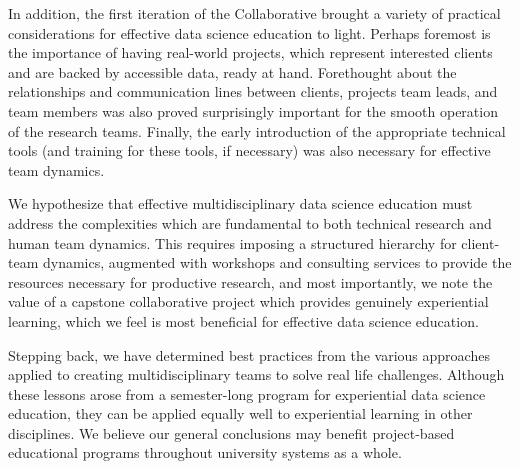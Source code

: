 \documentclass{sig-alternate}
\begin{document}
In addition, the first iteration of the Collaborative brought a variety of practical considerations for effective data science education to light.  Perhaps foremost is the importance of having real-world projects, which represent interested clients and are backed by accessible data, ready at hand.  Forethought about the relationships and communication lines between clients, projects team leads, and team members was also proved surprisingly important for the smooth operation of the research teams.  Finally, the early introduction of the appropriate technical tools (and training for these tools, if necessary) was also necessary for effective team dynamics.

We hypothesize that effective multidisciplinary data science education must address the complexities which are fundamental to both technical research and human team dynamics. This requires imposing a structured hierarchy for client-team dynamics, augmented with workshops and consulting services to provide the resources necessary for productive research, and most importantly, we note the value of a capstone collaborative project which provides genuinely experiential learning, which we feel is most beneficial for effective data science education.

Stepping back, we have determined best practices from the various approaches applied to creating multidisciplinary teams to solve real life challenges.  Although these lessons arose from a semester-long program for experiential data science education, they can be applied equally well to experiential learning in other disciplines.  We believe our general conclusions may benefit project-based educational programs throughout university systems as a whole.










\end{document}
